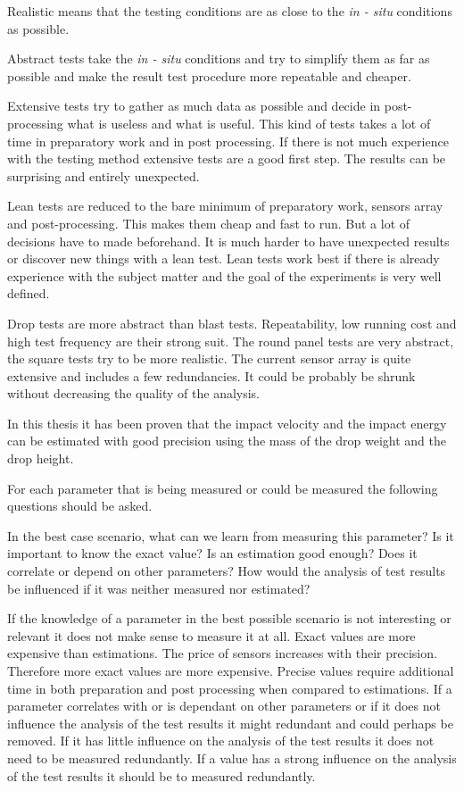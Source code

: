 Realistic means that the testing conditions are as close to the \textit{in - situ} conditions as possible. %

Abstract tests take the \textit{in - situ} conditions and try to simplify them as far as possible and make the result test procedure more repeatable and cheaper. 

Extensive tests try to gather as much data as possible and decide in post-processing what is useless and what is useful. This kind of tests takes a lot of time in preparatory work and in post processing. If there is not much experience with the testing method extensive tests are a good first step. The results can be surprising and entirely unexpected.

Lean tests are reduced to the bare minimum of preparatory work, sensors array and post-processing. This makes them cheap and fast to run. But a lot of decisions have to made beforehand. It is much harder to have unexpected results or discover new things with a lean test. Lean tests work best if there is already experience with the subject matter and the goal of the experiments is very well defined.

Drop tests are more abstract than blast tests. Repeatability, low running cost and high test frequency are their strong suit. The round panel tests are very abstract, the square tests try to be more realistic. The current sensor array is quite extensive and includes a few redundancies. It could be probably be shrunk without decreasing the quality of the analysis. 


In this thesis it has been proven that the impact velocity and the impact energy can be estimated with good precision using the mass of the drop weight and the drop height. 

For each parameter that is being measured or could be measured the following questions should be asked.

In the best case scenario, what can we learn from measuring this parameter? Is it important to know the exact value? Is an estimation good enough? Does it correlate or depend on other parameters? How would the analysis of test results be influenced if it was neither measured nor estimated?

If the knowledge of a parameter in the best possible scenario is not interesting or relevant it does not make sense to measure it at all. 
Exact values are more expensive than estimations. The price of sensors increases with their precision. Therefore more exact values are more expensive. Precise values require additional time in both preparation and post processing when compared to estimations. If a parameter correlates with or is dependant on other parameters or if it does not influence the analysis of the test results it might redundant and could perhaps be removed. If it has little influence on the analysis of the test results it does not need to be measured redundantly. If a value has a strong influence on the analysis of the test results it should be to measured redundantly. 

